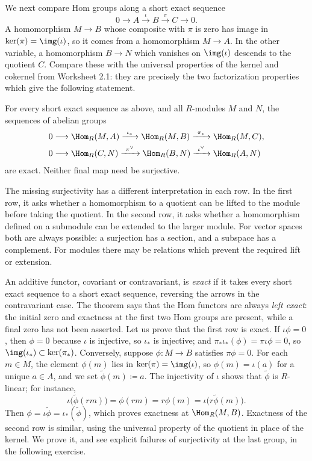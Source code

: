 \documentclass[12pt,reqno]{amsart}
\begin{document}
We next compare Hom groups along a short exact sequence
\[
0\longrightarrow A\xrightarrow{\ \iota\ }B\xrightarrow{\ \pi\ }C\longrightarrow0.
\]
A homomorphism $M\to B$ whose composite with $\pi$ is zero has image in $\ker(\pi)=\img(\iota)$, so it comes from a homomorphism $M\to A$. In the other variable, a homomorphism $B\to N$ which vanishes on $\img(\iota)$ descends to the quotient $C$. Compare these with the universal properties of the kernel and cokernel from Worksheet 2.1: they are precisely the two factorization properties which give the following statement.

\begin{theorem}
For every short exact sequence as above, and all $R$-modules $M$ and $N$, the sequences of abelian groups
\[
\begin{aligned}
0&\longrightarrow\Hom_R(M,A)\xrightarrow{\ \iota_*\ }\Hom_R(M,B)\xrightarrow{\ \pi_*\ }\Hom_R(M,C),\\
0&\longrightarrow\Hom_R(C,N)\xrightarrow{\ \pi^{\vee}\ }\Hom_R(B,N)\xrightarrow{\ \iota^{\vee}\ }\Hom_R(A,N)
\end{aligned}
\]
are exact. Neither final map need be surjective.
\end{theorem}

The missing surjectivity has a different interpretation in each row. In the first row, it asks whether a homomorphism to a quotient can be lifted to the module before taking the quotient. In the second row, it asks whether a homomorphism defined on a submodule can be extended to the larger module. For vector spaces both are always possible: a surjection has a section, and a subspace has a complement. For modules there may be relations which prevent the required lift or extension.

An additive functor, covariant or contravariant, is \emph{exact} if it takes every short exact sequence to a short exact sequence, reversing the arrows in the contravariant case. The theorem says that the Hom functors are always \emph{left exact}: the initial zero and exactness at the first two Hom groups are present, while a final zero has not been asserted. Let us prove that the first row is exact. If $\iota\phi=0$, then $\phi=0$ because $\iota$ is injective, so $\iota_*$ is injective; and $\pi_*\iota_*(\phi)=\pi\iota\phi=0$, so $\img(\iota_*)\subset\ker(\pi_*)$. Conversely, suppose $\phi:M\to B$ satisfies $\pi\phi=0$. For each $m\in M$, the element $\phi(m)$ lies in $\ker(\pi)=\img(\iota)$, so $\phi(m)=\iota(a)$ for a unique $a\in A$, and we set $\widetilde\phi(m)\coloneqq a$. The injectivity of $\iota$ shows that $\widetilde\phi$ is $R$-linear; for instance,
\[
\iota\bigl(\widetilde\phi(rm)\bigr)=\phi(rm)=r\phi(m)=\iota\bigl(r\widetilde\phi(m)\bigr).
\]
Then $\phi=\iota\widetilde\phi=\iota_*(\widetilde\phi)$, which proves exactness at $\Hom_R(M,B)$. Exactness of the second row is similar, using the universal property of the quotient in place of the kernel. We prove it, and see explicit failures of surjectivity at the last group, in the following exercise.
\end{document}
